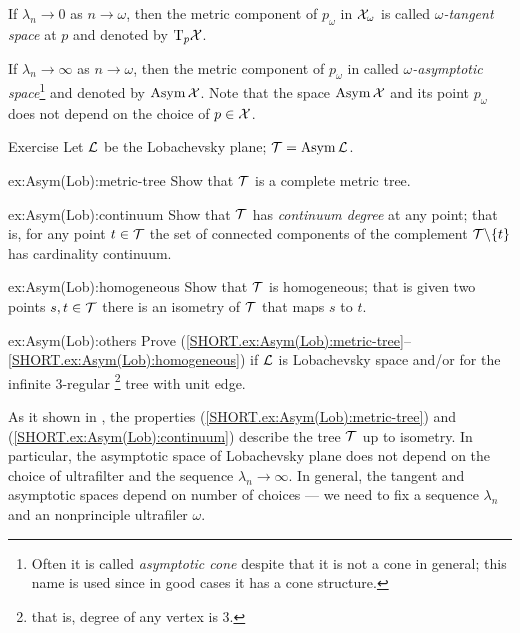 If $\lambda_n\to 0$ as $n\to\omega$, then the metric component of $p_\omega$ in $\mathcal{X}_\omega$ is called \emph{$\omega$-tangent space} at $p$ and denoted by $\mathrm{T}_p\mathcal{X}$.

If $\lambda_n\to \infty$ as $n\to\omega$, then the metric component of $p_\omega$ in called \emph{$\omega$-asymptotic space}\footnote{Often it is called \emph{asymptotic cone} despite that it is not a cone in general; this name is used since in good cases it has a cone structure.}  and denoted by $\mathop{\rm Asym}\nolimits\mathcal{X}$.
Note that the space $\mathop{\rm Asym}\nolimits\mathcal{X}$ and its point $p_\omega$ does not depend on the choice of $p\in \mathcal{X}$.

\begin{thm}{Exercise}\label{ex:Asym(Lob)}
Let $\mathcal{L}$ be the Lobachevsky plane; $\mathcal{T}=\mathop{\rm Asym}\nolimits\mathcal{L}$.

\begin{subthm}{ex:Asym(Lob):metric-tree}
Show that $\mathcal{T}$ is a complete metric tree.
\end{subthm}

\begin{subthm}{ex:Asym(Lob):continuum}
Show that $\mathcal{T}$ has \emph{continuum degree} at any point;
that is, for any point $t\in \mathcal{T}$ the set of connected components of the complement $\mathcal{T}\backslash\{t\}$ has cardinality continuum.
\end{subthm}

\begin{subthm}{ex:Asym(Lob):homogeneous}
Show that $\mathcal{T}$ is homogeneous; that is given two points $s,t\in \mathcal{T}$ there is an isometry of $\mathcal{T}$ that maps $s$ to $t$.
\end{subthm}

\begin{subthm}{ex:Asym(Lob):others}
Prove (\ref{SHORT.ex:Asym(Lob):metric-tree}--\ref{SHORT.ex:Asym(Lob):homogeneous}) if $\mathcal{L}$ is Lobachevsky space and/or for the infinite 3-regular%
\footnote{that is, degree of any vertex is 3.}
tree with unit edge. 
\end{subthm}


\end{thm}

As it shown in \cite{dyubina-polterovich}, the properties (\ref{SHORT.ex:Asym(Lob):metric-tree}) and (\ref{SHORT.ex:Asym(Lob):continuum}) describe the tree $\mathcal{T}$ up to isometry.
In particular, the asymptotic space of Lobachevsky plane does not depend on the choice of ultrafilter and the sequence $\lambda_n\to \infty$.
In general, the tangent and asymptotic spaces depend on number of choices --- we need to fix a sequence $\lambda_n$ and an nonprinciple ultrafiler $\omega$.
